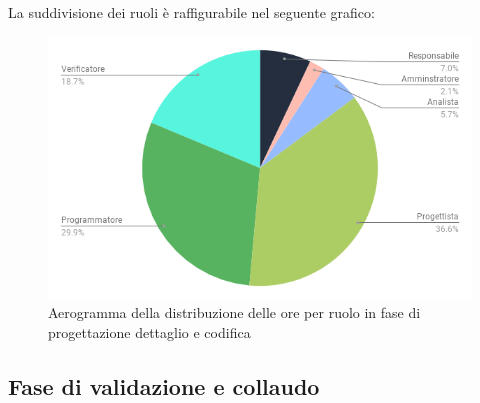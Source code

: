             \pagebreak

            La suddivisione dei ruoli è raffigurabile nel seguente grafico:
            \begin{figure}[H]
                \centering
                \includegraphics[scale=0.6]{immagini/pdc_pie.png}
                \caption{Aerogramma della distribuzione delle ore per ruolo in fase di progettazione dettaglio e codifica}
            \end{figure}

    \subsection{Fase di validazione e collaudo}
